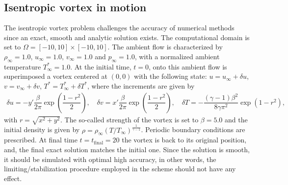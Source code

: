 \subsection{Isentropic vortex in motion} \label{ssec:vortex}
The isentropic vortex problem \cite{Shu1} challenges the accuracy of numerical methods since an exact, smooth and analytic solution exists. The computational domain is set to $\Omega = [-10,10]\times [-10,10]$.
The ambient flow is characterized by $\rho_\infty = 1.0$, $u_\infty = 1.0$, $v_\infty = 1.0$ and $p_\infty = 1.0$,
with a normalized ambient temperature $T^*_\infty =1.0$. 
At the initial time, $t=0$, onto this ambient flow is superimposed a vortex centered at $(0,0)$ with the following state:
$u = u_\infty + \delta u$, $ v = v_\infty + \delta v$, 
$ T^* = T^*_\infty + \delta T^*$, where the increments are given by
\begin{equation}
    \begin{array}{c}
      \nonumber
      \delta u   = -y' {\dfrac {\beta} {2 \pi}} \exp \left( {\dfrac {1-r^2} {2}} \right),  \quad 
      \delta v   = x' {\dfrac {\beta} {2 \pi}} \exp \left( {\dfrac {1-r^2} {2}} \right), \quad
      \delta T = - { \dfrac {(\gamma - 1 ) \beta^2} {8 \gamma \pi^2}} \exp \left( {1-r^2} \right),
    \end{array}
\end{equation}
with $r = \sqrt{x^2 + y^2}$. The so-called strength of the vortex is set to $\beta=5.0$ and the initial density is
given by  $\rho =   \rho_\infty \left( {{T}/{T_\infty} } \right)^{\frac{1}{\gamma-1} }$. Periodic boundary conditions are prescribed. 
At final time $t=t_{\text{final}}=20$ the vortex is back to its original position, and, the final exact solution matches the initial one. 
Since the solution is smooth, it should be simulated with optimal high accuracy, in other words, the limiting/stabilization procedure employed in the scheme should not have any effect. 
